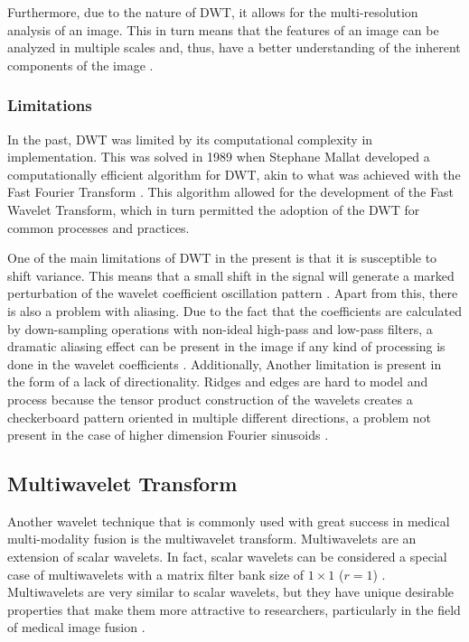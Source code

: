 \documentclass{article}
\begin{document}
Furthermore, due to the nature of DWT, it allows for the multi-resolution analysis of an image. This in turn means that the features of an image can be analyzed in multiple scales and, thus, have a better understanding of the inherent components of the image \cite{Chiorean.Vaida.2009, Cheng.He.Lv.2008, Kavitha.Chellamuthu.Rajesh.2012}.

\subsubsection{Limitations}
In the past, DWT was limited by its computational complexity in implementation. This was solved in 1989 when Stephane Mallat developed a computationally efficient algorithm for DWT, akin to what was achieved with the Fast Fourier Transform \cite{Gonzalez.Woods.2008, Mallat.1989}. This algorithm allowed for the development of the Fast Wavelet Transform, which in turn permitted the adoption of the DWT for common processes and practices.

One of the main limitations of DWT in the present is that it is susceptible to shift variance. This means that a small shift in the signal will generate a marked perturbation of the wavelet coefficient oscillation pattern \cite{IvanW.Selesnick.2005}. Apart from this, there is also a problem with aliasing. Due to the fact that the coefficients are calculated by down-sampling operations with non-ideal high-pass and low-pass filters, a dramatic aliasing effect can be present in the image if any kind of processing is done in the wavelet coefficients \cite{IvanW.Selesnick.2005}. Additionally, Another limitation is present in the form of a lack of directionality. Ridges and edges are hard to model and process because the tensor product construction of the wavelets creates a checkerboard pattern oriented in multiple different directions, a problem not present in the case of higher dimension Fourier sinusoids \cite{IvanW.Selesnick.2005}.

\subsection{Multiwavelet Transform}
Another wavelet technique that is commonly used with great success in medical multi-modality fusion is the multiwavelet transform. Multiwavelets are an extension of scalar wavelets. In fact, scalar wavelets can be considered a special case of multiwavelets with a matrix filter bank size of $1 \times 1$ ($r = 1$) \cite{Wang2004}. Multiwavelets are very similar to scalar wavelets, but they have unique desirable properties that make them more attractive to researchers, particularly in the field of medical image fusion \cite{Wang2004, Liu2010, Peng2015}.
\end{document}
